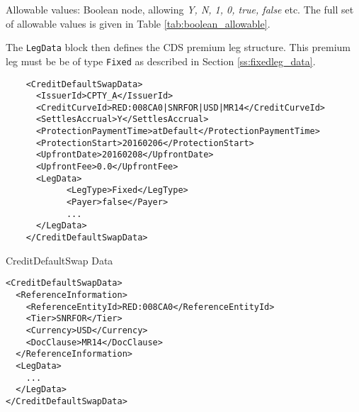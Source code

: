\begin{itemize}
Allowable values: Boolean node, allowing \emph{Y, N, 1, 0, true, false} etc. The full set of allowable values is given in Table \ref{tab:boolean_allowable}.
\end{itemize}

The \lstinline!LegData! block then defines the CDS premium leg structure. This premium leg must be be of type \lstinline!Fixed! as described in Section \ref{ss:fixedleg_data}.

\begin{listing}[H]
\begin{verbatim}
    <CreditDefaultSwapData>
      <IssuerId>CPTY_A</IssuerId>
      <CreditCurveId>RED:008CA0|SNRFOR|USD|MR14</CreditCurveId>
      <SettlesAccrual>Y</SettlesAccrual>
      <ProtectionPaymentTime>atDefault</ProtectionPaymentTime>
      <ProtectionStart>20160206</ProtectionStart>
      <UpfrontDate>20160208</UpfrontDate>
      <UpfrontFee>0.0</UpfrontFee>
      <LegData>
            <LegType>Fixed</LegType>
            <Payer>false</Payer>
            ...
      </LegData>
    </CreditDefaultSwapData>
\end{verbatim}
\caption{CreditDefaultSwap Data}
\label{lst:cdsdata}
\end{listing}

\begin{listing}[H]
\begin{verbatim}
<CreditDefaultSwapData>
  <ReferenceInformation>
    <ReferenceEntityId>RED:008CA0</ReferenceEntityId>
    <Tier>SNRFOR</Tier>
    <Currency>USD</Currency>
    <DocClause>MR14</DocClause>
  </ReferenceInformation>
  <LegData>
    ...
  </LegData>
</CreditDefaultSwapData>
\end{verbatim}
\caption{\lstinline!CreditDefaultSwapData! with \lstinline!ReferenceInformation!}
\label{lst:cdsdata_with_ref_info}
\end{listing}
